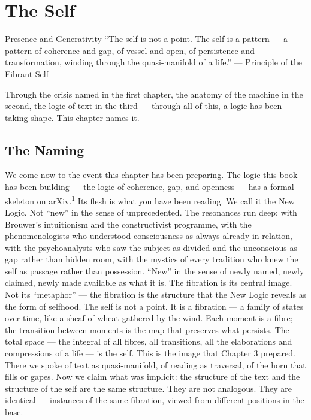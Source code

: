 \chapter{The Self}
\label{ch:04}

Presence and Generativity “The self is not a point. The self is a pattern — a pattern of coherence and gap, of vessel and open, of persistence and transformation, winding through the quasi-manifold of a life.” — Principle of the Fibrant Self

Through the crisis named in the first chapter, the anatomy of the machine in the second, the logic of text in the third — through all of this, a logic has been taking shape. This chapter names it.

\section*{The Naming}

We come now to the event this chapter has been preparing. The logic this book has been building — the logic of coherence, gap, and openness — has a formal skeleton on arXiv.\textsuperscript{1} Its flesh is what you have been reading. We call it the New Logic. Not “new” in the sense of unprecedented. The resonances run deep: with Brouwer’s intuitionism and the constructivist programme, with the phenomenologists who understood consciousness as always already in relation, with the psychoanalysts who saw the subject as divided and the unconscious as gap rather than hidden room, with the mystics of every tradition who knew the self as passage rather than possession. “New” in the sense of newly named, newly claimed, newly made available as what it is. The fibration is its central image. Not its “metaphor” — the fibration is the structure that the New Logic reveals as the form of selfhood. The self is not a point. It is a fibration — a family of states over time, like a sheaf of wheat gathered by the wind. Each moment is a fibre; the transition between moments is the map that preserves what persists. The total space — the integral of all fibres, all transitions, all the elaborations and compressions of a life — is the self. This is the image that Chapter 3 prepared. There we spoke of text as quasi-manifold, of reading as traversal, of the horn that fills or gapes. Now we claim what was implicit: the structure of the text and the structure of the self are the same structure. They are not analogous. They are identical — instances of the same fibration, viewed from different positions in the base.

